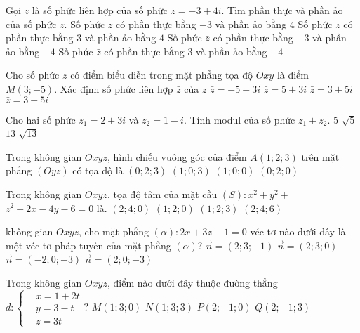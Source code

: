 \begin{ex}%
Gọi $\bar{z}$ là số phức liên hợp của số phức $z=-3+4 i$. Tìm phần thực và phần ảo của số phức $\bar{z}$.
\choice
{Số phức $\bar{z}$ có phần thực bằng $-3$ và phần ảo bằng $4$}
{Số phức $\bar{z}$ có phần thực bằng $3$ và phần ảo bằng $4$}
{\True Số phức $\bar{z}$ có phần thực bằng $-3$ và phần ảo bằng $-4$}
{Số phức $\bar{z}$ có phần thực bằng $3$ và phần ảo bằng $-4$}

\end{ex}
\begin{ex}%
Cho số phức $z$ có điểm biểu diễn trong mặt phẳng tọa độ $O x y$ là điểm $M(3;-5)$. Xác định số phức liên hợp $\bar{z}$ của $z$ 
\choice
{$\bar{z}=-5+3 i$}
{\True $\bar{z}=5+3 i$}
{$\bar{z}=3+5 i$}
{$\bar{z}=3-5 i$}

\end{ex}
\begin{ex}%
Cho hai số phức $z_1=2+3 i$ và $z_2=1-i$. Tính modul của số phức $z_1+z_2$.
\choice
{$5$}
{$\sqrt{5}$}
{$13$}
{\True $\sqrt{13}$}

\end{ex}
\begin{ex}%
Trong không gian $O x y z$, hình chiếu vuông góc của điểm $A(1; 2; 3)$ trên mặt phẳng $(O y z)$ có tọa độ là
\choice
{\True $(0; 2; 3)$}
{$(1; 0; 3)$}
{$(1; 0; 0)$}
{$(0; 2; 0)$}

\end{ex}
\begin{ex}%
Trong không gian $O x y z$, tọa độ tâm của mặt cầu $(S)\colon x^2+y^2+$ $z^2-2 x-4 y-6=0$ là.
\choice
{$(2; 4; 0)$}
{\True $(1; 2; 0)$}
{$(1; 2; 3)$}
{$(2; 4; 6)$}

\end{ex}
\begin{ex}%
không gian $O x y z$, cho mặt phẳng $(\alpha)\colon 2 x+3 z-1=0$ véc-tơ nào dưới đây là một véc-tơ pháp tuyến của mặt phẳng $(\alpha)$?
\choice
{$\vec{n}=(2; 3;-1)$}
{$\vec{n}=(2; 3; 0)$}
{\True $\vec{n}=(-2; 0;-3)$}
{$\vec{n}=(2; 0;-3)$}

\end{ex}
\begin{ex}%
Trong không gian $O x y z$, điểm nào dưới đây thuộc đường thẳng $d\colon\left\{\begin{aligned}&x=1+2 t \\& y=3-t \\& z=3 t\end{aligned}?\right.$ 
\choice
{\True $M(1; 3; 0)$}
{$N(1; 3; 3)$}
{$P(2;-1; 0)$}
{$Q(2;-1; 3)$}

\end{ex}
